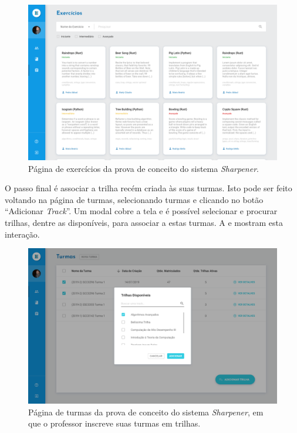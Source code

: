   \begin{figure}[htb]
  \centering
  \includegraphics[width=\linewidth]{images/mocks/exercicios.png}
  \caption{Página de exercícios da prova de conceito do sistema \emph{Sharpener}.}%
  \label{fig:exercicios}
  \end{figure}

O passo final é associar a trilha recém criada às suas turmas. Isto pode ser feito voltando na página de turmas, selecionando 
turmas e clicando no botão ``Adicionar \emph{Track}''. Um modal cobre a tela e é possível selecionar e procurar trilhas, dentre 
as disponíveis, para associar a estas turmas. A  e  mostram esta interação.

  \begin{figure}[htb]
    \centering
    \includegraphics[width=\linewidth]{images/mocks/turmaAddTrack.png}
    \caption{Página de turmas da prova de conceito do sistema \emph{Sharpener}, em 
	    que o professor inscreve suas turmas em trilhas.}%
    \label{fig:enroll_track1}
  \end{figure}
  
